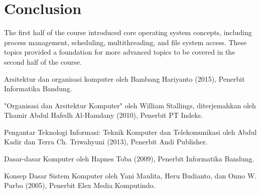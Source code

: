 \documentclass[12pt]{article}
\begin{document}
\section{Conclusion}
The first half of the course introduced core operating system concepts, including process management, scheduling, multithreading, and file system access. These topics provided a foundation for more advanced topics to be covered in the second half of the course.

\begin{thebibliography}{}
\bibitem{}
Arsitektur dan organisasi komputer oleh Bambang Hariyanto (2015), Penerbit Informatika Bandung.

\bibitem{}
"Organisasi dan Arsitektur Komputer" oleh William Stallings, diterjemahkan oleh Thamir Abdul Hafedh Al-Hamdany (2010), Penerbit PT Indeks.

\bibitem{}
Pengantar Teknologi Informasi: Teknik Komputer dan Telekomunikasi oleh Abdul Kadir dan Terra Ch. Triwahyuni (2013), Penerbit Andi Publisher.

\bibitem{}
Dasar-dasar Komputer oleh Hapnes Toba (2009), Penerbit Informatika Bandung.

\bibitem{}
Konsep Dasar Sistem Komputer oleh Yani Maulita, Heru Budianto, dan Onno W. Purbo (2005), Penerbit Elex Media Komputindo.
\end{thebibliography}
\end{document}

